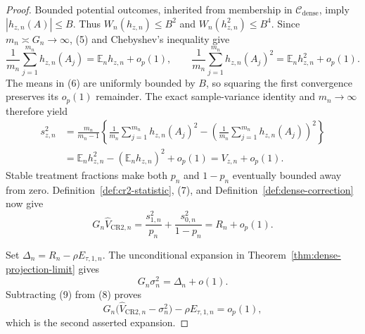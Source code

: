\documentclass{article}
\begin{document}
\begin{proof}
Bounded potential outcomes, inherited from membership in \(\mathcal C_{\mathrm{dense}}\), imply \(|h_{z,n}(A)|\le B\).  Thus \(W_n(h_{z,n})\le B^2\) and \(W_n(h_{z,n}^2)\le B^4\).  Since \(m_n\asymp G_n\to\infty\), (5) and Chebyshev's inequality give
\[
 \frac1{m_n}\sum_{j=1}^{m_n}h_{z,n}(A_j)
   =\mathbb E_nh_{z,n}+o_p(1),
 \qquad
 \frac1{m_n}\sum_{j=1}^{m_n}h_{z,n}(A_j)^2
   =\mathbb E_nh_{z,n}^2+o_p(1).
 \tag{6}
\]
The means in (6) are uniformly bounded by \(B\), so squaring the first convergence preserves its \(o_p(1)\) remainder.  The exact sample-variance identity and \(m_n\to\infty\) therefore yield
\[
 \begin{aligned}
 s_{z,n}^2
 &=\frac{m_n}{m_n-1}\left\{
   \frac1{m_n}\sum_{j=1}^{m_n}h_{z,n}(A_j)^2
   -\left(\frac1{m_n}\sum_{j=1}^{m_n}h_{z,n}(A_j)\right)^2
   \right\}\\
 &=\mathbb E_nh_{z,n}^2-(\mathbb E_nh_{z,n})^2+o_p(1)
 =V_{z,n}+o_p(1).
 \end{aligned}
 \tag{7}
\]
Stable treatment fractions make both \(p_n\) and \(1-p_n\) eventually bounded away from zero.  Definition~\ref{def:cr2-statistic}, (7), and Definition~\ref{def:dense-correction} now give
\[
 G_n\widehat V_{\mathrm{CR2},n}
 =\frac{s_{1,n}^2}{p_n}+\frac{s_{0,n}^2}{1-p_n}
 =R_n+o_p(1).
 \tag{8}
\]

Set \(\Delta_n=R_n-\rho E_{\tau,1,n}\).  The unconditional expansion in Theorem~\ref{thm:dense-projection-limit} gives
\[
 G_n\sigma_n^2=\Delta_n+o(1).
 \tag{9}
\]
Subtracting (9) from (8) proves
\[
 G_n\bigl(\widehat V_{\mathrm{CR2},n}-\sigma_n^2\bigr)
   -\rho E_{\tau,1,n}=o_p(1),
 \tag{10}
\]
which is the second asserted expansion.


\end{proof}
\end{document}
